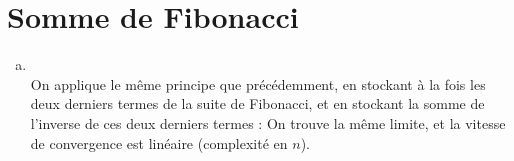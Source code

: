 \section{Somme de Fibonacci}
\begin{enumerate}[(a)]
  \item {}
        \\
        \bigskip
        On applique le même principe que précédemment, en stockant à la fois les deux derniers termes de la suite de
        Fibonacci, et en stockant la somme de l'inverse de ces deux derniers termes :
        \bigskip
        \bigskip
        On trouve la même limite, et la vitesse de convergence est linéaire (complexité en $n$).
\end{enumerate}
